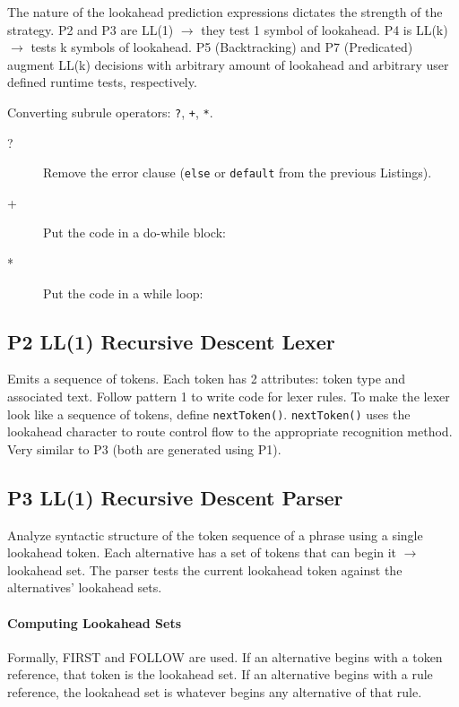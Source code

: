 The nature of the lookahead prediction expressions
dictates the strength of the strategy.
P2 and P3 are LL(1) $\rightarrow$ they test 1 symbol of lookahead.
P4 is LL(k) $\rightarrow$ tests k symbols of lookahead.
P5 (Backtracking) and P7 (Predicated) augment LL(k) decisions
with arbitrary amount of lookahead and arbitrary user defined runtime tests,
respectively.

Converting subrule operators: \verb=?=, \verb=+=, \verb=*=.
\begin{description}
\item[?]
Remove the error clause
(\verb=else= or \verb=default= from the previous Listings).

\item[+]
Put the code in a do-while block:

\item[*]
Put the code in a while loop:

\end{description}


\subsection{P2 LL(1) Recursive Descent Lexer}

Emits a sequence of tokens. Each token has 2 attributes:
token type and associated text.
Follow pattern 1 to write code for lexer rules.
To make the lexer look like a sequence of tokens, define \verb=nextToken()=.
\verb=nextToken()= uses the lookahead character to route control flow
to the appropriate recognition method.
Very similar to P3 (both are generated using P1).


\subsection{P3 LL(1) Recursive Descent Parser}

Analyze syntactic structure of the token sequence of a phrase
using a single lookahead token.
Each alternative has a set of tokens that can begin it $\rightarrow$
lookahead set.
The parser tests the current lookahead token
against the alternatives' lookahead sets.

\paragraph{Computing Lookahead Sets}
Formally, FIRST and FOLLOW are used.
If an alternative begins with a token reference,
that token is the lookahead set.
If an alternative begins with a rule reference,
the lookahead set is whatever begins any alternative of that rule.

